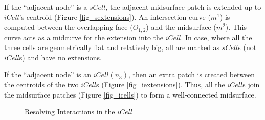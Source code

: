 If the ``adjacent node'' is a $sCell$, the adjacent midsurface-patch is extended up to $iCell$'s centroid (Figure  \ref{fig_sextensions}). An intersection curve ($m^1$) is computed between the overlapping face ($O_{1,2}$) and the midsurface ($m^2$). This curve acts as a midcurve for the extension into the $iCell$. In case, where all the three cells are geometrically flat and relatively big, all are marked as  $sCell$s (not $iCell$s) and have no extensions. 

If the ``adjacent node'' is an $iCell(n_3)$, then an extra patch is created between the centroids of the two $iCell$s (Figure  \ref{fig_iextensions}). Thus, all the $iCell$s join the midsurface patches (Figure \ref{fig_icells}) to form a well-connected midsurface.

	\begin{figure}[!h]
	\centering     %
	\caption{Resolving Interactions in the $iCell$}
	\label{fig_resolveiCell}
	\end{figure}

